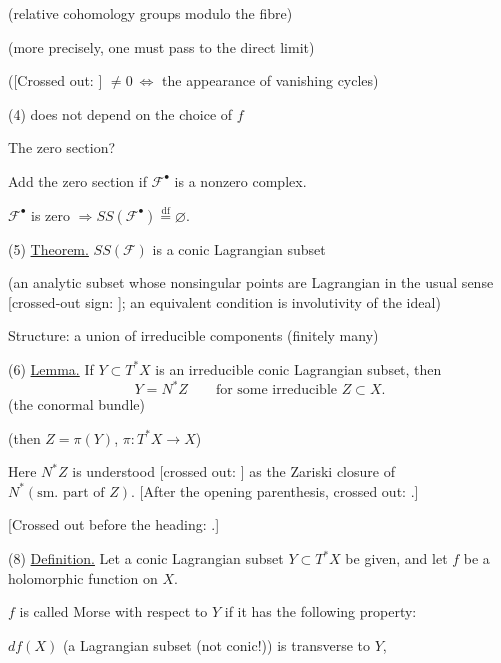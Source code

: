 (relative cohomology groups modulo the fibre)

(more precisely, one must pass to the direct limit)

([Crossed out: ]
$\ne0\ \Longleftrightarrow$ the appearance of vanishing cycles)

(4) does not depend on the choice of $f$

The zero section?

Add the zero section if $\mathcal{F}^{\bullet}$ is a nonzero complex.

$\mathcal{F}^{\bullet}$ is zero
$\Rightarrow SS(\mathcal{F}^{\bullet})\overset{\mathrm{df}}{=}\varnothing$.

(5) \underline{Theorem.}
$SS(\mathcal{F})$ is a conic Lagrangian subset

(an analytic subset whose nonsingular points are Lagrangian in the usual sense
[crossed-out sign: ];
an equivalent condition is involutivity of the ideal)

Structure: a union of irreducible components (finitely many)

(6) \underline{Lemma.}
If $Y\subset T^{*}X$ is an irreducible conic Lagrangian subset, then
\begin{equation*}
Y=N^{*}Z\qquad
\text{for some irreducible }Z\subset X. \tag{7}
\end{equation*}
(the conormal bundle)

(then $Z=\pi(Y)$, $\pi:T^{*}X\longrightarrow X$)

Here $N^{*}Z$ is understood
[crossed out: ]
as the Zariski closure of
$N^{*}(\text{sm. part of }Z)$.
[After the opening parenthesis, crossed out:
.]

[Crossed out before the heading:
.]

(8) \underline{Definition.}
Let a conic Lagrangian subset $Y\subset T^{*}X$ be given,
and let $f$ be a holomorphic function on $X$.

$f$ is called Morse with respect to $Y$ if it has the following property:

$df(X)$ (a Lagrangian subset (not conic!)) is transverse to $Y$,

